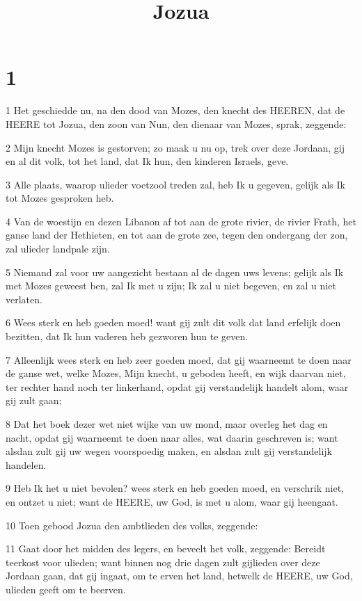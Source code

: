 

\title{Jozua}



\chapter{1}

\par 1 Het geschiedde nu, na den dood van Mozes, den knecht des HEEREN, dat de HEERE tot Jozua, den zoon van Nun, den dienaar van Mozes, sprak, zeggende:
\par 2 Mijn knecht Mozes is gestorven; zo maak u nu op, trek over deze Jordaan, gij en al dit volk, tot het land, dat Ik hun, den kinderen Israels, geve.
\par 3 Alle plaats, waarop ulieder voetzool treden zal, heb Ik u gegeven, gelijk als Ik tot Mozes gesproken heb.
\par 4 Van de woestijn en dezen Libanon af tot aan de grote rivier, de rivier Frath, het ganse land der Hethieten, en tot aan de grote zee, tegen den ondergang der zon, zal ulieder landpale zijn.
\par 5 Niemand zal voor uw aangezicht bestaan al de dagen uws levens; gelijk als Ik met Mozes geweest ben, zal Ik met u zijn; Ik zal u niet begeven, en zal u niet verlaten.
\par 6 Wees sterk en heb goeden moed! want gij zult dit volk dat land erfelijk doen bezitten, dat Ik hun vaderen heb gezworen hun te geven.
\par 7 Alleenlijk wees sterk en heb zeer goeden moed, dat gij waarneemt te doen naar de ganse wet, welke Mozes, Mijn knecht, u geboden heeft, en wijk daarvan niet, ter rechter hand noch ter linkerhand, opdat gij verstandelijk handelt alom, waar gij zult gaan;
\par 8 Dat het boek dezer wet niet wijke van uw mond, maar overleg het dag en nacht, opdat gij waarneemt te doen naar alles, wat daarin geschreven is; want alsdan zult gij uw wegen voorspoedig maken, en alsdan zult gij verstandelijk handelen.
\par 9 Heb Ik het u niet bevolen? wees sterk en heb goeden moed, en verschrik niet, en ontzet u niet; want de HEERE, uw God, is met u alom, waar gij heengaat.
\par 10 Toen gebood Jozua den ambtlieden des volks, zeggende:
\par 11 Gaat door het midden des legers, en beveelt het volk, zeggende: Bereidt teerkost voor ulieden; want binnen nog drie dagen zult gijlieden over deze Jordaan gaan, dat gij ingaat, om te erven het land, hetwelk de HEERE, uw God, ulieden geeft om te beerven.
